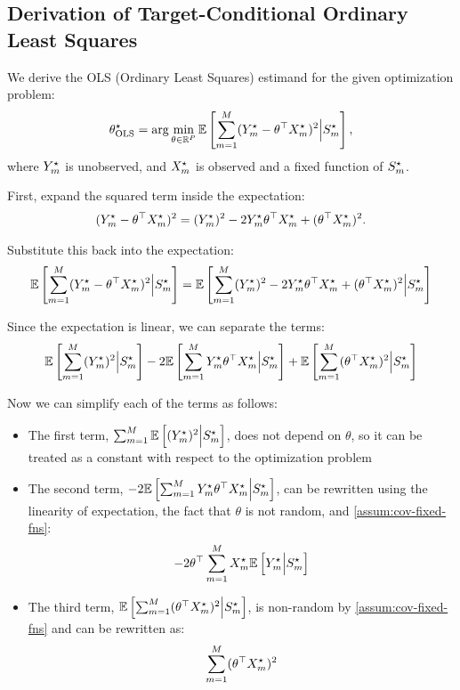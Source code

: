 \subsection{Derivation of Target-Conditional Ordinary Least Squares}
\label{app:derivation-target-cond-ols}

We derive the OLS (Ordinary Least Squares) estimand for the given optimization problem:
\begin{align}
  \theta^{\star}_{\text{OLS}} = \arg\min_{\theta \in \mathbb{R}^P} \mathbb{E}\left[\sum_{m=1}^M (Y^{\star}_m - \theta^{\top}X^{\star}_m)^2 \Big| S^{\star}_m\right],  
\end{align}
where $Y^{\star}_m$ is unobserved, and $X^{\star}_m$ is observed and a fixed function of $S^{\star}_m$.

First, expand the squared term inside the expectation:
\begin{align}
    (Y^{\star}_m - \theta^{\top}X^{\star}_m)^2 = (Y^{\star}_m)^2 - 2Y^{\star}_m \theta^{\top}X^{\star}_m + (\theta^{\top}X^{\star}_m)^2.  
\end{align}


Substitute this back into the expectation:
\begin{align}
   \mathbb{E}\left[\sum_{m=1}^M (Y^{\star}_m - \theta^{\top}X^{\star}_m)^2 \Big| S^{\star}_m\right] = \mathbb{E}\left[\sum_{m=1}^M (Y^{\star}_m)^2 - 2Y^{\star}_m \theta^{\top}X^{\star}_m + (\theta^{\top}X^{\star}_m)^2 \Big| S^{\star}_m\right] 
\end{align}

Since the expectation is linear, we can separate the terms:
\begin{align}
  \mathbb{E}\left[\sum_{m=1}^M (Y^{\star}_m)^2 \Big| S^{\star}_m\right] - 2 \mathbb{E}\left[\sum_{m=1}^M Y^{\star}_m \theta^{\top}X^{\star}_m \Big| S^{\star}_m\right] + \mathbb{E}\left[\sum_{m=1}^M (\theta^{\top}X^{\star}_m)^2 \Big| S^{\star}_m\right]  
\end{align}

Now we can simplify each of the terms as follows: 
\begin{itemize}
    \item The first term, $\sum_{m=1}^M \mathbb{E}\left[(Y^{\star}_m)^2 \Big| S^{\star}_m\right]$, does not depend on $\theta$, so it can be treated as a constant with respect to the optimization problem
    \item The second term, $-2 \mathbb{E}\left[\sum_{m=1}^M Y^{\star}_m \theta^{\top}X^{\star}_m \Big| S^{\star}_m\right]$, can be rewritten using the linearity of expectation, the fact that \(\theta\) is not random, and \cref{assum:cov-fixed-fns}:
    \begin{align}
       -2 \theta^{\top} \sum_{m=1}^M X^{\star}_m \mathbb{E}\left[Y^{\star}_m  \Big| S^{\star}_m\right] 
    \end{align} 
    \item The third term, $\mathbb{E}\left[\sum_{m=1}^M (\theta^{\top}X^{\star}_m)^2 \Big| S^{\star}_m\right]$, is non-random by \cref{assum:cov-fixed-fns} and can be rewritten as:
    \begin{align}
        \sum_{m=1}^M (\theta^{\top} X^{\star}_m)^2 
    \end{align}
\end{itemize}

